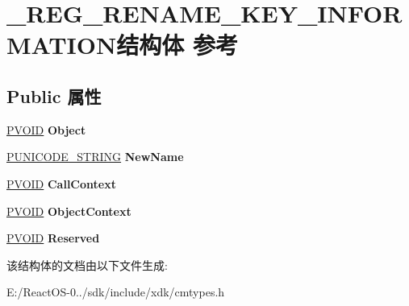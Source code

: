 \hypertarget{struct___r_e_g___r_e_n_a_m_e___k_e_y___i_n_f_o_r_m_a_t_i_o_n}{}\section{\+\_\+\+R\+E\+G\+\_\+\+R\+E\+N\+A\+M\+E\+\_\+\+K\+E\+Y\+\_\+\+I\+N\+F\+O\+R\+M\+A\+T\+I\+O\+N结构体 参考}
\label{struct___r_e_g___r_e_n_a_m_e___k_e_y___i_n_f_o_r_m_a_t_i_o_n}
\subsection*{Public 属性}
\begin{DoxyCompactItemize}
\item 
\mbox{\label{struct___r_e_g___r_e_n_a_m_e___k_e_y___i_n_f_o_r_m_a_t_i_o_n_ab263f54f184d7ca511065cf2f3dc02f9}} 
\hyperlink{interfacevoid}{P\+V\+O\+ID} {\bfseries Object}
\item 
\mbox{\label{struct___r_e_g___r_e_n_a_m_e___k_e_y___i_n_f_o_r_m_a_t_i_o_n_ada5c91e4efcc78522bc75f7aa0dc30df}} 
\hyperlink{struct___u_n_i_c_o_d_e___s_t_r_i_n_g}{P\+U\+N\+I\+C\+O\+D\+E\+\_\+\+S\+T\+R\+I\+NG} {\bfseries New\+Name}
\item 
\mbox{\label{struct___r_e_g___r_e_n_a_m_e___k_e_y___i_n_f_o_r_m_a_t_i_o_n_ad48075cbbd6fa00f42380bef357bc51b}} 
\hyperlink{interfacevoid}{P\+V\+O\+ID} {\bfseries Call\+Context}
\item 
\mbox{\label{struct___r_e_g___r_e_n_a_m_e___k_e_y___i_n_f_o_r_m_a_t_i_o_n_af91079eae7704392ff2738b526d191de}} 
\hyperlink{interfacevoid}{P\+V\+O\+ID} {\bfseries Object\+Context}
\item 
\mbox{\label{struct___r_e_g___r_e_n_a_m_e___k_e_y___i_n_f_o_r_m_a_t_i_o_n_ac94a88e13b6c6e81b368c12eeb29cbb2}} 
\hyperlink{interfacevoid}{P\+V\+O\+ID} {\bfseries Reserved}
\end{DoxyCompactItemize}


该结构体的文档由以下文件生成\+:\begin{DoxyCompactItemize}
\item 
E\+:/\+React\+O\+S-\/0../sdk/include/xdk/cmtypes.\+h\end{DoxyCompactItemize}
